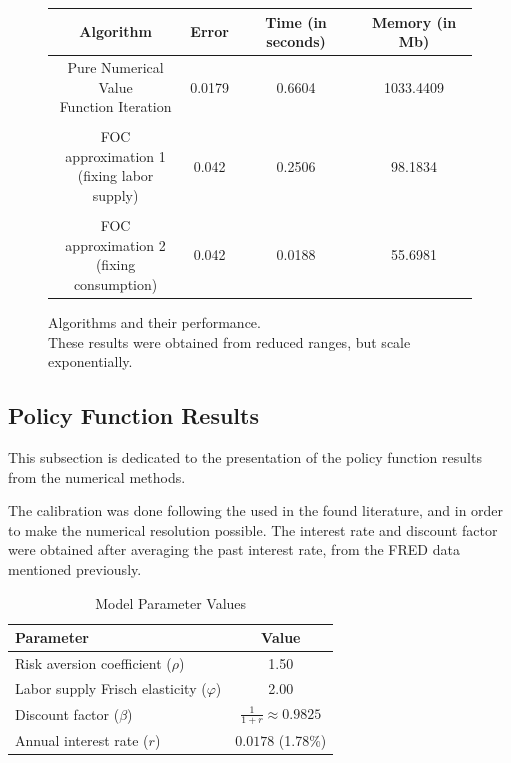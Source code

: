 \documentclass{article}
\begin{document}
\begin{figure}[H]
    \begin{tabular}{cccc}
    \toprule
    Algorithm & Error & Time (in seconds) & Memory (in Mb)\\
    \midrule
    \makecell{Pure Numerical Value \\ Function Iteration} & 0.0179 & 0.6604 & 1033.4409\\
    \\
    \makecell{FOC approximation 1 \\ (fixing labor supply)} & 0.042 & 0.2506 & 98.1834\\
    \\
    \makecell{FOC approximation 2 \\ (fixing consumption)} & 0.042 & 0.0188 & 55.6981\\
    \bottomrule
    \end{tabular}
    \caption{Algorithms and their performance.\\
    These results were obtained from reduced ranges, but scale exponentially.}
\end{figure}

\subsection{Policy Function Results}

This subsection is dedicated to the presentation of the policy function 
results from the numerical methods. 

The calibration was done following
the used in the found literature, 
and in order to make the numerical resolution possible.
The interest rate and discount factor were obtained after averaging
the past interest rate, from the FRED data mentioned previously.

\begin{table}[H]
\centering
\caption{Model Parameter Values}
\label{tab:parameters}
\begin{tabular}{lc}
\toprule
\textbf{Parameter} & \textbf{Value} \\
\midrule
Risk aversion coefficient ($\rho$) & 1.50 \\
Labor supply Frisch elasticity ($\varphi$) & 2.00 \\
Discount factor ($\beta$) & $\frac{1}{1+r} \approx 0.9825$ \\
Annual interest rate ($r$) &  $0.0178$ (1.78\%) \\
\bottomrule
\end{tabular}
\end{table}
\end{document}
